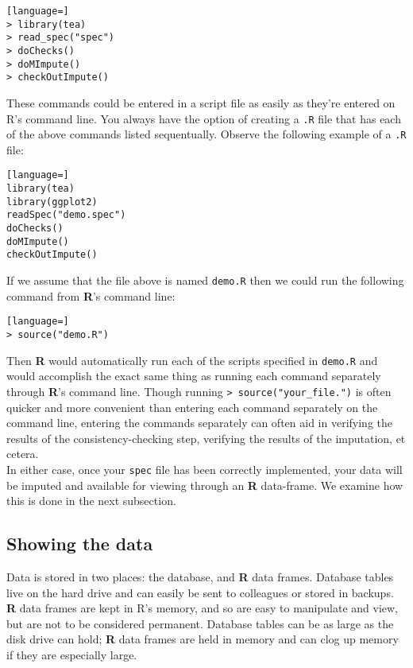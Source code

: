 \documentclass{article}
\begin{document}
\begin{lstlisting}[language=]
> library(tea)
> read_spec("spec")
> doChecks()
> doMImpute()
> checkOutImpute()
\end{lstlisting}

These commands could be entered in a script file as easily as they're entered on R's command line.
You always have the option of creating a {\tt .R} file that has each of the above commands listed 
sequentually. Observe the following example of a {\tt .R} file:

\begin{lstlisting}[language=]
library(tea)
library(ggplot2)
readSpec("demo.spec")
doChecks()
doMImpute()
checkOutImpute()
\end{lstlisting}

If we assume that the file above is named {\tt demo.R} then we could run the following command 
from \textbf{R}'s command line:

\begin{lstlisting}[language=]
> source("demo.R")
\end{lstlisting}

Then \textbf{R} would automatically run each of the scripts specified in {\tt demo.R} and would 
accomplish the exact same thing as running each command separately through \textbf{R}'s command line.
Though running {\tt > source("your\_file.")} is often quicker and more convenient than entering 
each command separately on the command line, entering the commands separately can often aid in 
verifying the results of the consistency-checking step, verifying the results of the imputation, 
et cetera.\\

In either case, once your {\tt spec} file has been correctly implemented, your data will be 
imputed and available for viewing through an \textbf{R} data-frame.
We examine how this is done in the next subsection.

\subsection{Showing the data}
Data is stored in two places: the database, and \textbf{R} data frames. Database tables
live on the hard drive and can easily be sent to colleagues or stored in
backups. \textbf{R} data frames are kept in R's memory, and so are easy to manipulate and
view, but are not to be considered permanent. Database tables can be as large as
the disk drive can hold; \textbf{R} data frames are held in memory and can clog up memory if
they are especially large.
\end{document}
